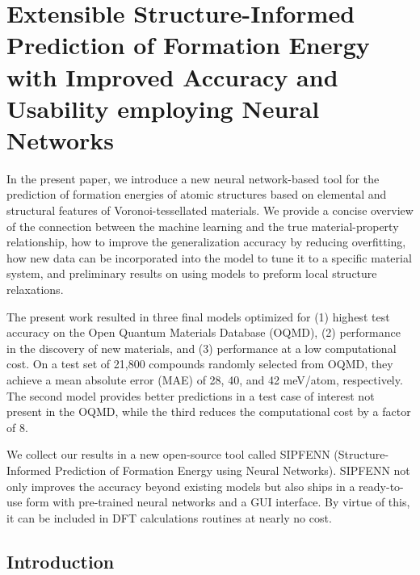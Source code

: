 \chapter{Extensible Structure-Informed Prediction of Formation Energy with Improved Accuracy and Usability employing Neural Networks} \label{chap:sipfenn}

In the present paper, we introduce a new neural network-based tool for the prediction of formation energies of atomic structures based on elemental and structural features of Voronoi-tessellated materials. We provide a concise overview of the connection between the machine learning and the true material-property relationship, how to improve the generalization accuracy by reducing overfitting, how new data can be incorporated into the model to tune it to a specific material system, and preliminary results on using models to preform local structure relaxations.

The present work resulted in three final models optimized for (1) highest test accuracy on the Open Quantum Materials Database (OQMD), (2) performance in the discovery of new materials, and (3) performance at a low computational cost. On a test set of 21,800 compounds randomly selected from OQMD, they achieve a mean absolute error (MAE) of 28, 40, and 42 meV/atom, respectively. The second model provides better predictions in a test case of interest not present in the OQMD, while the third reduces the computational cost by a factor of 8.

We collect our results in a new open-source tool called SIPFENN (Structure-Informed Prediction of Formation Energy using Neural Networks). SIPFENN not only improves the accuracy beyond existing models but also ships in a ready-to-use form with pre-trained neural networks and a GUI  interface. By virtue of this, it can be included in DFT calculations routines at nearly no cost.


\section{Introduction} \label{sipfenn:sec:Introduction}

